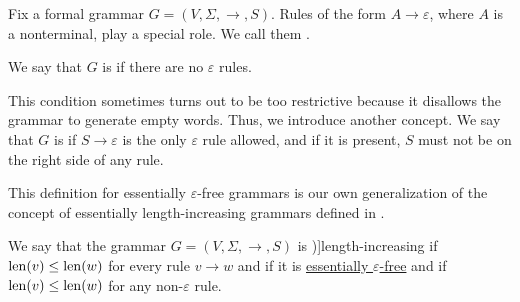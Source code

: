 \begin{definition}\label{def:epsilon_free_grammar}
  Fix a formal grammar \( G = (V, \Sigma, \to, S) \). Rules of the form \( A \to \varepsilon \), where \( A \) is a nonterminal, play a special role. We call them .

  We say that \( G \) is  if there are no \( \varepsilon \) rules.

  This condition sometimes turns out to be too restrictive because it disallows the grammar to generate empty words. Thus, we introduce another concept. We say that \( G \) is  if \( S \to \varepsilon \) is the only \( \varepsilon \) rule allowed, and if it is present, \( S \) must not be on the right side of any rule.
\end{definition}
\begin{comments}
  \item This definition for essentially \( \varepsilon \)-free grammars is our own generalization of the concept of essentially length-increasing grammars defined in .
\end{comments}

\begin{definition}\label{def:length_increasing_grammar}
  We say that the grammar \( G = (V, \Sigma, \to, S) \) is \term[ru=неукорачивающая (граматика) (\cite[83]{Гладкий1973})]{length-increasing} if \( \operatorname{len}(v) \leq \operatorname{len}(w) \) for every rule \( v \to w \) and  if it is \hyperref[def:epsilon_free_grammar]{essentially \( \varepsilon \)-free} and if \( \operatorname{len}(v) \leq \operatorname{len}(w) \) for any non-\( \varepsilon \) rule.
\end{definition}

